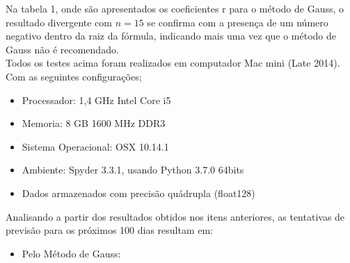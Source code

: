 \documentclass{article}
\begin{document}
\text Na tabela 1, onde são apresentados os coeficientes r para o método de Gauss, o resultado divergente com $n=15$ se confirma com a presença de um número negativo dentro da raiz da fórmula, indicando mais uma vez que o método de Gauss não é recomendado.\\

\text Todos os testes acima foram realizados em computador Mac mini (Late 2014).\\
Com as seguintes configurações;
\begin{itemize}
\item Processador: 1,4 GHz Intel Core i5
\item Memoria: 8 GB 1600 MHz DDR3
\item Sistema Operacional: OSX 10.14.1
\item Ambiente: Spyder 3.3.1, usando Python 3.7.0 64bits
\item Dados armazenados com precisão quádrupla (float128)
\end{itemize}

\newpage 
Analisando a partir dos resultados obtidos nos itens anteriores, as tentativas de previsão para os próximos 100 dias resultam em:

\begin{itemize}
\item Pelo Método de Gauss:
\end{itemize}
\end{document}
